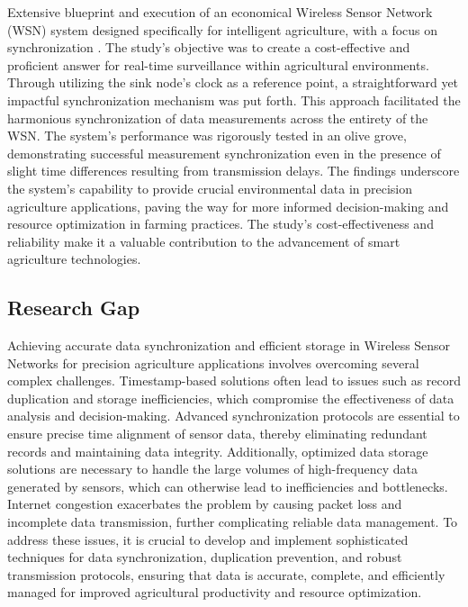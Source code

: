 Extensive blueprint and execution of an economical Wireless Sensor Network (WSN) system designed specifically for intelligent agriculture, with a focus on synchronization \cite{zervopoulos2020wireless}. The study's objective was to create a cost-effective and proficient answer for real-time surveillance within agricultural environments. Through utilizing the sink node's clock as a reference point, a straightforward yet impactful synchronization mechanism was put forth. This approach facilitated the harmonious synchronization of data measurements across the entirety of the WSN. The system's performance was rigorously tested in an olive grove, demonstrating successful measurement synchronization even in the presence of slight time differences resulting from transmission delays. The findings underscore the system's capability to provide crucial environmental data in precision agriculture applications, paving the way for more informed decision-making and resource optimization in farming practices. The study's cost-effectiveness and reliability make it a valuable contribution to the advancement of smart agriculture technologies.
   
\subsection*{Research Gap}
Achieving accurate data synchronization and efficient storage in 
Wireless Sensor Networks for precision agriculture applications involves overcoming several complex challenges. Timestamp-based solutions often lead to issues such as record duplication and storage inefficiencies, which compromise the effectiveness of data analysis and decision-making. Advanced synchronization protocols are essential to ensure precise time alignment of sensor data, thereby eliminating redundant records and maintaining data integrity. Additionally, optimized data storage solutions are necessary to handle the large volumes of high-frequency data generated by sensors, which can otherwise lead to inefficiencies and bottlenecks. Internet congestion exacerbates the problem by causing packet loss and incomplete data transmission, further complicating reliable data management. To address these issues, it is crucial to develop and implement sophisticated techniques for data synchronization, duplication prevention, and robust transmission protocols, ensuring that data is accurate, complete, and efficiently managed for improved agricultural productivity and resource optimization.

